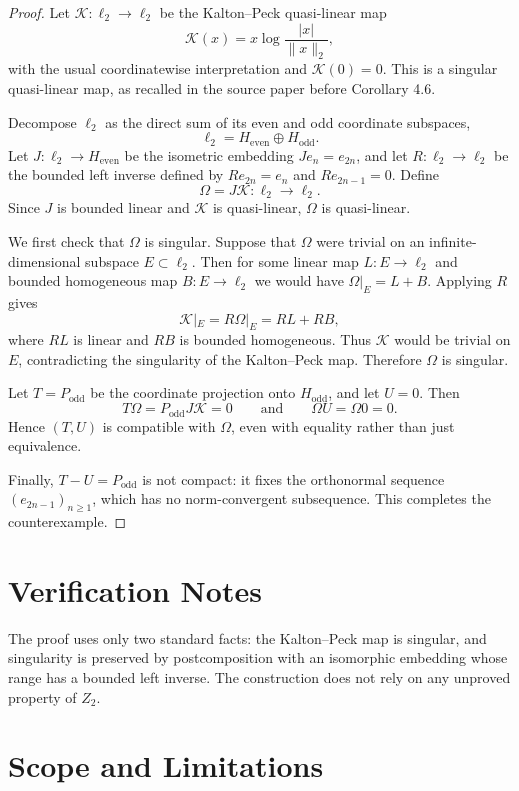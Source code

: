 \documentclass[11pt]{article}
\newcommand{\K}{\mathscr K}
\begin{document}
\begin{proof}
Let $\K:\ell_2\to\ell_2$ be the Kalton--Peck quasi-linear map
\[
  \K(x)=x\log\frac{|x|}{\|x\|_2},
\]
with the usual coordinatewise interpretation and $\K(0)=0$. This is a
singular quasi-linear map, as recalled in the source paper before Corollary
4.6.

Decompose $\ell_2$ as the direct sum of its even and odd coordinate subspaces,
\[
  \ell_2 = H_{\mathrm{even}}\oplus H_{\mathrm{odd}}.
\]
Let $J:\ell_2\to H_{\mathrm{even}}$ be the isometric embedding
$J e_n=e_{2n}$, and let $R:\ell_2\to\ell_2$ be the bounded left inverse
defined by $R e_{2n}=e_n$ and $R e_{2n-1}=0$. Define
\[
  \Omega=J\K:\ell_2\to\ell_2.
\]
Since $J$ is bounded linear and $\K$ is quasi-linear, $\Omega$ is
quasi-linear.

We first check that $\Omega$ is singular. Suppose that $\Omega$ were trivial
on an infinite-dimensional subspace $E\subset \ell_2$. Then for some linear
map $L:E\to\ell_2$ and bounded homogeneous map $B:E\to\ell_2$ we would have
$\Omega|_E=L+B$. Applying $R$ gives
\[
  \K|_E = R\Omega|_E = RL + RB,
\]
where $RL$ is linear and $RB$ is bounded homogeneous. Thus $\K$ would be
trivial on $E$, contradicting the singularity of the Kalton--Peck map.
Therefore $\Omega$ is singular.

Let $T=P_{\mathrm{odd}}$ be the coordinate projection onto
$H_{\mathrm{odd}}$, and let $U=0$. Then
\[
  T\Omega = P_{\mathrm{odd}}J\K =0
  \qquad\text{and}\qquad
  \Omega U=\Omega 0=0.
\]
Hence $(T,U)$ is compatible with $\Omega$, even with equality rather than just
equivalence.

Finally, $T-U=P_{\mathrm{odd}}$ is not compact: it fixes the orthonormal
sequence $(e_{2n-1})_{n\ge 1}$, which has no norm-convergent subsequence.
This completes the counterexample.
\end{proof}

\section*{Verification Notes}

The proof uses only two standard facts: the Kalton--Peck map is singular, and
singularity is preserved by postcomposition with an isomorphic embedding whose
range has a bounded left inverse. The construction does not rely on any
unproved property of $Z_2$.

\section*{Scope and Limitations}
\end{document}
